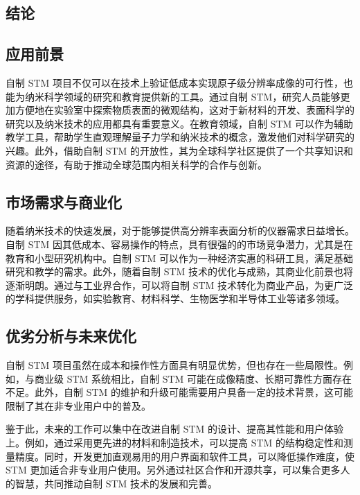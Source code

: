 \documentclass{article}
\begin{document}
\begin{spacing}{1.625}
	
	
	\clearpage
	\setcounter{section}{5}	 	%
	\setcounter{subsection}{0}	%
	
	
	\section*{结论}
	\setParDis %
	\subsection{应用前景}
	自制 STM 项目不仅可以在技术上验证低成本实现原子级分辨率成像的可行性，也能为纳米科学领域的研究和教育提供新的工具。通过自制 STM，研究人员能够更加方便地在实验室中探索物质表面的微观结构，这对于新材料的开发、表面科学的研究以及纳米技术的应用都具有重要意义。在教育领域，自制 STM 可以作为辅助教学工具，帮助学生直观理解量子力学和纳米技术的概念，激发他们对科学研究的兴趣。此外，借助自制 STM 的开放性，其为全球科学社区提供了一个共享知识和资源的途径，有助于推动全球范围内相关科学的合作与创新。
	
	
	\subsection{市场需求与商业化}
	随着纳米技术的快速发展，对于能够提供高分辨率表面分析的仪器需求日益增长。自制 STM 因其低成本、容易操作的特点，具有很强的的市场竞争潜力，尤其是在教育和小型研究机构中。自制 STM 可以作为一种经济实惠的科研工具，满足基础研究和教学的需求。此外，随着自制 STM 技术的优化与成熟，其商业化前景也将逐渐明朗。通过与工业界合作，可以将自制 STM 技术转化为商业产品，为更广泛的学科提供服务，如实验教育、材料科学、生物医学和半导体工业等诸多领域。
	
	
	\subsection{优劣分析与未来优化}
	自制 STM 项目虽然在成本和操作性方面具有明显优势，但也存在一些局限性。例如，与商业级 STM 系统相比，自制 STM 可能在成像精度、长期可靠性方面存在不足。此外，自制 STM 的维护和升级可能需要用户具备一定的技术背景，这可能限制了其在非专业用户中的普及。
	
	鉴于此，未来的工作可以集中在改进自制 STM 的设计、提高其性能和用户体验上。例如，通过采用更先进的材料和制造技术，可以提高 STM 的结构稳定性和测量精度。同时，开发更加直观易用的用户界面和软件工具，可以降低操作难度，使 STM 更加适合非专业用户使用。另外通过社区合作和开源共享，可以集合更多人的智慧，共同推动自制 STM 技术的发展和完善。
	



\end{spacing}
\end{document}
